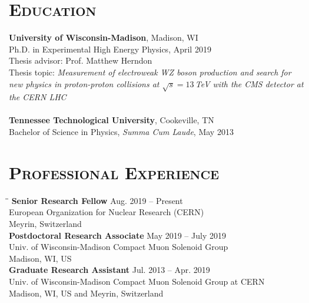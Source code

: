 \documentclass[10pt]{res} %
\begin{document}

\address{{\bf Current Address} \\  CERN B32/4-B03 \\  Geneva 23 \\ Switzerland}
\address{{\bf Permanent Address} \\ 5710 Lake Mendota Dr. \\ Madison, WI, 53705, US
\\ Tel: +41 77 501 95 13}

\begin{resume}
\section{\textsc{Education}}
  \textbf{University of Wisconsin-Madison}, Madison, WI \\
Ph.D. in Experimental High Energy Physics, April 2019 \\
  Thesis advisor: Prof. Matthew Herndon \\
    Thesis topic: \emph{Measurement of electroweak WZ boson production and search for new physics in proton-proton collisions at $\sqrt{s}=13$\,TeV with the CMS detector at the CERN LHC} \\
\\
  \textbf{Tennessee Technological University}, Cookeville, TN \\
Bachelor of Science in Physics, \textit{Summa Cum Laude}, May 2013

\section{\textsc{Professional Experience}}
\vspace{-0.1in}
\begin{tabbing}
\hspace{2.3in}\= \hspace{2.4in}\= \kill %
{\bf Senior Research Fellow} \>\> Aug. 2019 -- Present \\
European Organization for Nuclear Research (CERN)   \\  Meyrin, Switzerland \\
{\bf Postdoctoral Research Associate} \>\> May 2019 -- July 2019\\
Univ. of Wisconsin-Madison Compact Muon Solenoid Group \\  Madison, WI, US \\
{\bf Graduate Research Assistant} \>\> Jul. 2013 -- Apr. 2019\\
Univ. of Wisconsin-Madison Compact Muon Solenoid Group at CERN   \\  Madison, WI, US and Meyrin, Switzerland \\
\end{tabbing}\vspace{-20pt}      %


\end{resume}
\end{document}
